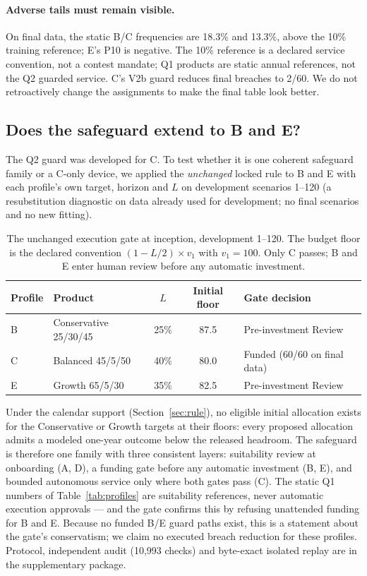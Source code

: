 \documentclass[11pt,a4paper]{article}
\begin{document}
\paragraph{Adverse tails must remain visible.}
On final data, the static B/C frequencies are 18.3\% and 13.3\%, above the 10\%
training reference; E's P10 is negative. The 10\% reference is a declared service
convention, not a contest mandate; Q1 products are static annual references, not
the Q2 guarded service. C's V2b guard reduces final breaches to 2/60. We do not
retroactively change the assignments to make the final table look better.

\subsection{Does the safeguard extend to B and E?}
\label{sec:gate}
The Q2 guard was developed for C. To test whether it is one coherent safeguard
family or a C-only device, we applied the \emph{unchanged} locked rule to B and
E with each profile's own target, horizon and $L$ on development scenarios
1--120 (a resubstitution diagnostic on data already used for development; no
final scenarios and no new fitting).

\begin{table}[H]
\centering
\caption{The unchanged execution gate at inception, development 1--120. The
budget floor is the declared convention $(1-L/2)\times v_1$ with $v_1=100$.
Only C passes; B and E enter human review before any automatic investment.}
\label{tab:gate}
\begin{tabular}{@{}llccl@{}}
\toprule
Profile & Product & $L$ & Initial floor & Gate decision \\
\midrule
B & Conservative 25/30/45 & 25\% & 87.5 & Pre-investment Review \\
C & Balanced 45/5/50 & 40\% & 80.0 & Funded (60/60 on final data) \\
E & Growth 65/5/30 & 35\% & 82.5 & Pre-investment Review \\
\bottomrule
\end{tabular}
\end{table}

Under the calendar support (Section~\ref{sec:rule}), no eligible initial
allocation exists for the Conservative or Growth targets at their floors:
every proposed allocation admits a modeled one-year outcome below the released
headroom. The safeguard is therefore one family with three consistent layers:
suitability review at onboarding (A, D), a funding gate before any automatic
investment (B, E), and bounded autonomous service only where both gates pass
(C). The static Q1 numbers of Table~\ref{tab:profiles} are suitability
references, never automatic execution approvals --- and the gate confirms this
by refusing unattended funding for B and E. Because no funded B/E guard paths
exist, this is a statement about the gate's conservatism; we claim no executed
breach reduction for these profiles. Protocol, independent audit (10{,}993
checks) and byte-exact isolated replay are in the supplementary package.
\end{document}
